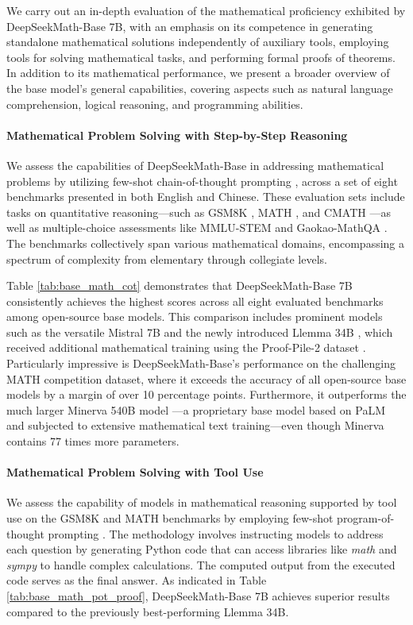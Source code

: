 \begin{itemize}[topsep=0pt]
We carry out an in-depth evaluation of the mathematical proficiency exhibited by DeepSeekMath-Base 7B, with an emphasis on its competence in generating standalone mathematical solutions independently of auxiliary tools, employing tools for solving mathematical tasks, and performing formal proofs of theorems. In addition to its mathematical performance, we present a broader overview of the base model’s general capabilities, covering aspects such as natural language comprehension, logical reasoning, and programming abilities.

\paragraph{Mathematical Problem Solving with Step-by-Step Reasoning}

We assess the capabilities of DeepSeekMath-Base in addressing mathematical problems by utilizing few-shot chain-of-thought prompting \citep{cot}, across a set of eight benchmarks presented in both English and Chinese. These evaluation sets include tasks on quantitative reasoning—such as GSM8K \citep{gsm8k}, MATH \citep{MATH}, and CMATH \citep{wei2023cmath}—as well as multiple-choice assessments like MMLU-STEM \citep{mmlu} and Gaokao-MathQA \citep{agieval}. The benchmarks collectively span various mathematical domains, encompassing a spectrum of complexity from elementary through collegiate levels.

Table \ref{tab:base_math_cot} demonstrates that DeepSeekMath-Base 7B consistently achieves the highest scores across all eight evaluated benchmarks among open-source base models. This comparison includes prominent models such as the versatile Mistral 7B \citep{mistral} and the newly introduced Llemma 34B \citep{llemma}, which received additional mathematical training using the Proof-Pile-2 dataset \citep{llemma}. Particularly impressive is DeepSeekMath-Base's performance on the challenging MATH competition dataset, where it exceeds the accuracy of all open-source base models by a margin of over 10 percentage points. Furthermore, it outperforms the much larger Minerva 540B model \citep{minerva}—a proprietary base model based on PaLM \citep{palm} and subjected to extensive mathematical text training—even though Minerva contains 77 times more parameters.

\paragraph{Mathematical Problem Solving with Tool Use} We assess the capability of models in mathematical reasoning supported by tool use on the GSM8K and MATH benchmarks by employing few-shot program-of-thought prompting \citep{pot,pal}. The methodology involves instructing models to address each question by generating Python code that can access libraries like \textit{math} and \textit{sympy} to handle complex calculations. The computed output from the executed code serves as the final answer. As indicated in Table \ref{tab:base_math_pot_proof}, DeepSeekMath-Base 7B achieves superior results compared to the previously best-performing Llemma 34B.


\end{itemize}
